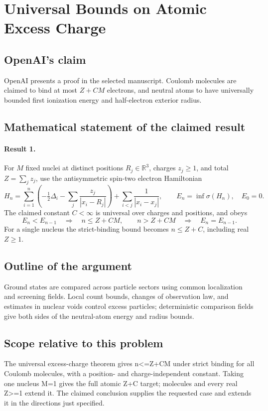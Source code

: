 \documentclass[11pt]{article}
\begin{document}
\section*{Universal Bounds on Atomic Excess Charge}

\subsection{OpenAI's claim}
OpenAI presents a proof in the selected manuscript. Coulomb molecules are claimed to bind at most $Z+CM$ electrons, and neutral atoms to have universally bounded first ionization energy and half-electron exterior radius.

\subsection{Mathematical statement of the claimed result}
\paragraph{Result 1.} For \(M\) fixed nuclei at distinct positions \(R_j\in\mathbb R^3\), charges \(z_j\ge1\), and total \(Z=\sum_jz_j\), use the antisymmetric spin-two electron Hamiltonian
\[
 H_n=\sum_{i=1}^n\left(-\tfrac12\Delta_i-\sum_j\frac{z_j}{|x_i-R_j|}\right)
 +\sum_{i<j}\frac1{|x_i-x_j|},\qquad E_n=\inf\sigma(H_n),\quad E_0=0.
\]
The claimed constant \(C<\infty\) is universal over charges and positions, and obeys
\[
 E_n<E_{n-1}\quad\Longrightarrow\quad n\le Z+CM,
 \qquad n>Z+CM\quad\Longrightarrow\quad E_n=E_{n-1}.
\]
For a single nucleus the strict-binding bound becomes \(n\le Z+C\), including real \(Z\ge1\).

\subsection{Outline of the argument}
Ground states are compared across particle sectors using common localization and screening fields. Local count bounds, changes of observation law, and estimates in nuclear voids control excess particles; deterministic comparison fields give both sides of the neutral-atom energy and radius bounds.

\subsection{Scope relative to this problem}
The universal excess-charge theorem gives n<=Z+CM under strict binding for all Coulomb molecules, with a position- and charge-independent constant. Taking one nucleus M=1 gives the full atomic Z+C target; molecules and every real Z>=1 extend it. The claimed conclusion supplies the requested case and extends it in the directions just specified.
\end{document}
